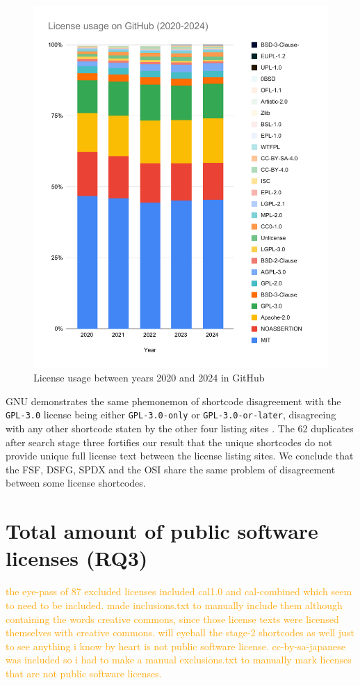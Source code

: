 \begin{figure}
	\centering
	\includegraphics[scale=0.73]{figures/figure-3-5.pdf}
	\caption{License usage between years 2020 and 2024 in GitHub}
	\label{fig:3-5}
\end{figure}
GNU demonstrates the same phemonemon of shortcode disagreement with the \texttt{GPL-3.0} license being either \texttt{GPL-3.0-only} or \texttt{GPL-3.0-or-later}, disagreeing with any other shortcode staten by the other four listing sites \citep{gnu:licenselist}. The 62 duplicates after search stage three fortifies our result that the unique shortcodes do not provide unique full license text between the license listing sites. We conclude that the FSF, DSFG, SPDX and the OSI share the same problem of disagreement between some license shortcodes.

\section{Total amount of public software licenses (RQ3)}
\textcolor{orange}{the eye-pass of 87 excluded licenses included cal1.0 and cal-combined which seem to need to be included. made inclusions.txt to manually include them although containing the words creative commons, since those license texts were licensed themselves with creative commons. will eyeball the stage-2 shortcodes as well just to see anything i know by heart is not public software license. cc-by-sa-japanese was included so i had to make a manual exclusions.txt to manually mark licenses that are not public software licenses.}


